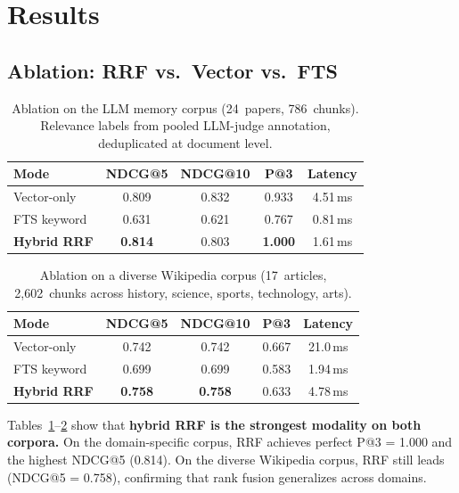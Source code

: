 \documentclass[11pt,a4paper]{article}
\begin{document}
\section{Results}
\label{sec:results}

\subsection{Ablation: RRF vs.\ Vector vs.\ FTS}
\label{sec:ablation}

\begin{table}[t]
  \centering
  \caption{Ablation on the LLM memory corpus (24~papers, 786~chunks).
    Relevance labels from pooled LLM-judge annotation, deduplicated
    at document level.}
  \label{tab:ablation}
  \begin{tabular}{lcccc}
    \toprule
    Mode & NDCG@5 & NDCG@10 & P@3 & Latency \\
    \midrule
    Vector-only  & 0.809 & 0.832 & 0.933 & 4.51\,ms \\
    FTS keyword  & 0.631 & 0.621 & 0.767 & 0.81\,ms \\
    \textbf{Hybrid RRF}   & \textbf{0.814} & 0.803 & \textbf{1.000} & 1.61\,ms \\
    \bottomrule
  \end{tabular}
\end{table}

\begin{table}[t]
  \centering
  \caption{Ablation on a diverse Wikipedia corpus (17~articles,
    2{,}602~chunks across history, science, sports, technology, arts).}
  \label{tab:ablation-wiki}
  \begin{tabular}{lcccc}
    \toprule
    Mode & NDCG@5 & NDCG@10 & P@3 & Latency \\
    \midrule
    Vector-only  & 0.742 & 0.742 & 0.667 & 21.0\,ms \\
    FTS keyword  & 0.699 & 0.699 & 0.583 & 1.94\,ms \\
    \textbf{Hybrid RRF}   & \textbf{0.758} & \textbf{0.758} & 0.633 & 4.78\,ms \\
    \bottomrule
  \end{tabular}
\end{table}

Tables~\ref{tab:ablation}--\ref{tab:ablation-wiki} show that
\textbf{hybrid RRF is the strongest modality on both corpora.}
On the domain-specific corpus, RRF achieves perfect P@3 = 1.000
and the highest NDCG@5 (0.814).  On the diverse Wikipedia corpus,
RRF still leads (NDCG@5 = 0.758), confirming that rank fusion
generalizes across domains.
\end{document}
